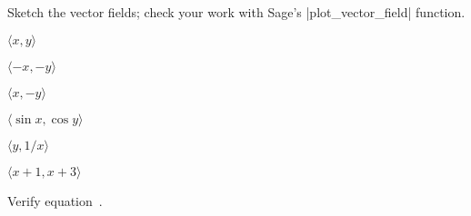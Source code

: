 \begin{exercises}

Sketch the vector fields; check your work with Sage's \vb|plot_vector_field|
function.

\exercise $\langle x,y\rangle$ 

\exercise $\langle -x, -y\rangle$ 

\exercise $\langle x,-y\rangle$ 

\exercise $\langle \sin x,\cos y\rangle$ 

\exercise $\langle y,1/x\rangle$ 

\exercise $\langle x+1,x+3\rangle$ 

\exercise Verify equation~.

\end{exercises}

